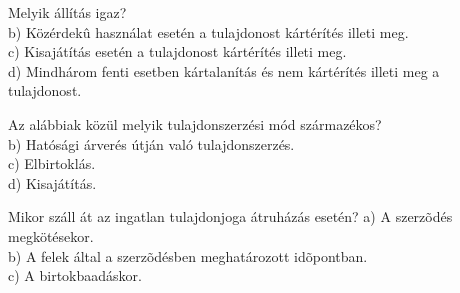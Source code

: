 \begin{frame}

\begin{tcolorbox}[title={118. Kérdés}]
Melyik állítás igaz?
\tcblower
{}\\
b) Közérdekû használat esetén a tulajdonost kártérítés illeti meg.\\
c) Kisajátítás esetén a tulajdonost kártérítés illeti meg.\\
d) Mindhárom fenti esetben kártalanítás és nem kártérítés illeti meg a tulajdonost.
\end{tcolorbox}

\begin{tcolorbox}[title={119. Kérdés}]
Az alábbiak közül melyik tulajdonszerzési mód származékos?
\tcblower
{}\\
b) Hatósági árverés útján való tulajdonszerzés.\\
c) Elbirtoklás.\\
d) Kisajátítás.
\end{tcolorbox}

\begin{tcolorbox}[title={120. Kérdés}]
Mikor száll át az ingatlan tulajdonjoga átruházás esetén?
\tcblower
a) A szerzõdés megkötésekor.\\
b) A felek által a szerzõdésben meghatározott idõpontban.\\
c) A birtokbaadáskor.\\
\end{tcolorbox}

\end{frame}


